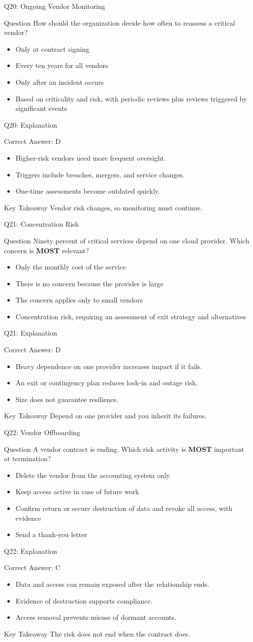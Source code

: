 \documentclass[aspectratio=169]{beamer}
\newcommand{\hq}[7]{%
	\begin{frame}{Q#1: #2}
		\begin{block}{Question}
			#3
		\end{block}
		\begin{itemize}
			#4
		\end{itemize}
	\end{frame}
	\begin{frame}{Q#1: Explanation}
		\begin{block}{Correct Answer: #5}
			\begin{itemize}
				#6
			\end{itemize}
		\end{block}
		\begin{alertblock}{Key Takeaway}
			#7
		\end{alertblock}
	\end{frame}
}
\begin{document}
	\hq{20}{Ongoing Vendor Monitoring}
	{How should the organization decide how often to reassess a critical vendor?}
	{\item[\textbf{(A)}] Only at contract signing
		\item[\textbf{(B)}] Every ten years for all vendors
		\item[\textbf{(C)}] Only after an incident occurs
		\item[\textbf{(D)}] Based on criticality and risk, with periodic reviews plus reviews triggered by significant events}
	{D}
	{\item Higher-risk vendors need more frequent oversight.
		\item Triggers include breaches, mergers, and service changes.
		\item One-time assessments become outdated quickly.}
	{Vendor risk changes, so monitoring must continue.}
	
	\hq{21}{Concentration Risk}
	{Ninety percent of critical services depend on one cloud provider. Which concern is \textbf{MOST} relevant?}
	{\item[\textbf{(A)}] Only the monthly cost of the service
		\item[\textbf{(B)}] There is no concern because the provider is large
		\item[\textbf{(C)}] The concern applies only to small vendors
		\item[\textbf{(D)}] Concentration risk, requiring an assessment of exit strategy and alternatives}
	{D}
	{\item Heavy dependence on one provider increases impact if it fails.
		\item An exit or contingency plan reduces lock-in and outage risk.
		\item Size does not guarantee resilience.}
	{Depend on one provider and you inherit its failures.}
	
	\hq{22}{Vendor Offboarding}
	{A vendor contract is ending. Which risk activity is \textbf{MOST} important at termination?}
	{\item[\textbf{(A)}] Delete the vendor from the accounting system only
		\item[\textbf{(B)}] Keep access active in case of future work
		\item[\textbf{(C)}] Confirm return or secure destruction of data and revoke all access, with evidence
		\item[\textbf{(D)}] Send a thank-you letter}
	{C}
	{\item Data and access can remain exposed after the relationship ends.
		\item Evidence of destruction supports compliance.
		\item Access removal prevents misuse of dormant accounts.}
	{The risk does not end when the contract does.}
	
\end{document}
